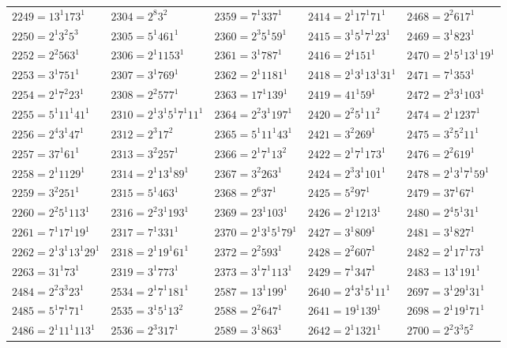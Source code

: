 {\begin{longtable}[c]{*{5}{l}}
$2249=13^{1}173^{1}$&$2304=2^{8}3^{2}$&$2359=7^{1}337^{1}$&$2414=2^{1}17^{1}71^{1}$&$2468=2^{2}617^{1}$\\
$2250=2^{1}3^{2}5^{3}$&$2305=5^{1}461^{1}$&$2360=2^{3}5^{1}59^{1}$&$2415=3^{1}5^{1}7^{1}23^{1}$&$2469=3^{1}823^{1}$\\
$2252=2^{2}563^{1}$&$2306=2^{1}1153^{1}$&$2361=3^{1}787^{1}$&$2416=2^{4}151^{1}$&$2470=2^{1}5^{1}13^{1}19^{1}$\\
$2253=3^{1}751^{1}$&$2307=3^{1}769^{1}$&$2362=2^{1}1181^{1}$&$2418=2^{1}3^{1}13^{1}31^{1}$&$2471=7^{1}353^{1}$\\
$2254=2^{1}7^{2}23^{1}$&$2308=2^{2}577^{1}$&$2363=17^{1}139^{1}$&$2419=41^{1}59^{1}$&$2472=2^{3}3^{1}103^{1}$\\
$2255=5^{1}11^{1}41^{1}$&$2310=2^{1}3^{1}5^{1}7^{1}11^{1}$&$2364=2^{2}3^{1}197^{1}$&$2420=2^{2}5^{1}11^{2}$&$2474=2^{1}1237^{1}$\\
$2256=2^{4}3^{1}47^{1}$&$2312=2^{3}17^{2}$&$2365=5^{1}11^{1}43^{1}$&$2421=3^{2}269^{1}$&$2475=3^{2}5^{2}11^{1}$\\
$2257=37^{1}61^{1}$&$2313=3^{2}257^{1}$&$2366=2^{1}7^{1}13^{2}$&$2422=2^{1}7^{1}173^{1}$&$2476=2^{2}619^{1}$\\
$2258=2^{1}1129^{1}$&$2314=2^{1}13^{1}89^{1}$&$2367=3^{2}263^{1}$&$2424=2^{3}3^{1}101^{1}$&$2478=2^{1}3^{1}7^{1}59^{1}$\\
$2259=3^{2}251^{1}$&$2315=5^{1}463^{1}$&$2368=2^{6}37^{1}$&$2425=5^{2}97^{1}$&$2479=37^{1}67^{1}$\\
$2260=2^{2}5^{1}113^{1}$&$2316=2^{2}3^{1}193^{1}$&$2369=23^{1}103^{1}$&$2426=2^{1}1213^{1}$&$2480=2^{4}5^{1}31^{1}$\\
$2261=7^{1}17^{1}19^{1}$&$2317=7^{1}331^{1}$&$2370=2^{1}3^{1}5^{1}79^{1}$&$2427=3^{1}809^{1}$&$2481=3^{1}827^{1}$\\
$2262=2^{1}3^{1}13^{1}29^{1}$&$2318=2^{1}19^{1}61^{1}$&$2372=2^{2}593^{1}$&$2428=2^{2}607^{1}$&$2482=2^{1}17^{1}73^{1}$\\
$2263=31^{1}73^{1}$&$2319=3^{1}773^{1}$&$2373=3^{1}7^{1}113^{1}$&$2429=7^{1}347^{1}$&$2483=13^{1}191^{1}$\\
\pagebreak
$2484=2^{2}3^{3}23^{1}$&$2534=2^{1}7^{1}181^{1}$&$2587=13^{1}199^{1}$&$2640=2^{4}3^{1}5^{1}11^{1}$&$2697=3^{1}29^{1}31^{1}$\\
$2485=5^{1}7^{1}71^{1}$&$2535=3^{1}5^{1}13^{2}$&$2588=2^{2}647^{1}$&$2641=19^{1}139^{1}$&$2698=2^{1}19^{1}71^{1}$\\
$2486=2^{1}11^{1}113^{1}$&$2536=2^{3}317^{1}$&$2589=3^{1}863^{1}$&$2642=2^{1}1321^{1}$&$2700=2^{2}3^{3}5^{2}$\\

\end{longtable}}
